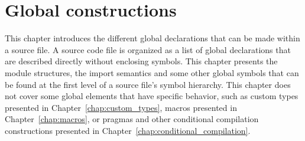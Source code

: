 \pagecolor{gray!10!white}
\chapter{Global constructions}%
\label{chap:chap5}

This chapter introduces the different global declarations that can be made
within a source file. A source code file is organized as a list of global
declarations that are described directly without enclosing symbols. This chapter
presents the module structures, the import semantics and some other global
symbols that can be found at the first level of a source file's symbol
hierarchy. This chapter does not cover some global elements that have specific
behavior, such as custom types presented in Chapter~\ref{chap:custom_types},
macros presented in Chapter~\ref{chap:macros}, or pragmas and other conditional
compilation constructions presented in
Chapter~\ref{chap:conditional_compilation}.

\minitoc%







